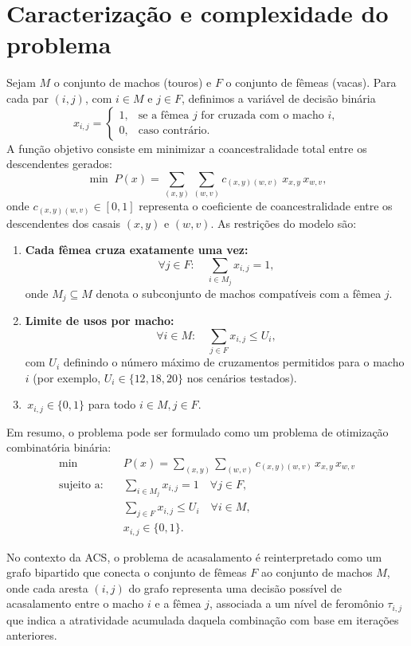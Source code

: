 \section{Caracterização e complexidade do problema}
\label{sec-complexidade-problema}
Sejam \(M\) o conjunto de machos (touros) e \(F\) o conjunto de fêmeas (vacas). Para cada par \((i,j)\), com \(i\in M\) e \(j\in F\), definimos a variável de decisão binária 
\[ x_{i,j} = \begin{cases} 1, & \text{se a fêmea } j \text{ for cruzada com o macho } i,\\[4pt] 0, & \text{caso contrário.} \end{cases} \]
A função objetivo consiste em minimizar a coancestralidade total entre os descendentes gerados:
\[ \min\; P(x) = \sum_{(x,y)}\sum_{(w,v)} c_{(x,y)(w,v)} \; x_{x,y}\, x_{w,v}, \] 
onde \(c_{(x,y)(w,v)}\in[0,1]\) representa o coeficiente de coancestralidade entre os descendentes dos casais \((x,y)\) e \((w,v)\). As restrições do modelo são:
\begin{enumerate} 
    \item \textbf{Cada fêmea cruza exatamente uma vez:} \[ \forall j\in F:\quad \sum_{i\in M_j} x_{i,j} = 1, \] onde \(M_j\subseteq M\) denota o subconjunto de machos compatíveis com a fêmea \(j\). 
    \item \textbf{Limite de usos por macho:} \[ \forall i\in M:\quad \sum_{j\in F} x_{i,j} \le U_i, \] com \(U_i\) definindo o número máximo de cruzamentos permitidos para o macho \(i\) (por exemplo, \(U_i\in\{12,18,20\}\) nos cenários testados). 
    \item \(\,x_{i,j}\in\{0,1\}\) para todo \(i\in M, j\in F\). 
\end{enumerate} 
Em resumo, o problema pode ser formulado como um problema de otimização combinatória binária: 
\[ \begin{aligned} 
\min\quad & P(x) = \sum_{(x,y)}\sum_{(w,v)} c_{(x,y)(w,v)} \, x_{x,y}\, x_{w,v}\\ 
\text{sujeito a:}\quad & \sum_{i\in M_j} x_{i,j} = 1\quad \forall j\in F,\\
&\sum_{j\in F} x_{i,j} \le U_i\quad \forall i\in M,\\
& x_{i,j}\in\{0,1\}. 
\end{aligned} \]

No contexto da ACS, o problema de acasalamento é reinterpretado como um grafo bipartido que conecta o conjunto de fêmeas \(F\) ao conjunto de machos \(M\), onde cada aresta \((i,j)\) do grafo representa uma decisão possível de acasalamento entre o macho \(i\) e a fêmea \(j\), associada a um nível de feromônio \(\tau_{i,j}\) que indica a atratividade acumulada daquela combinação com base em iterações anteriores. 

